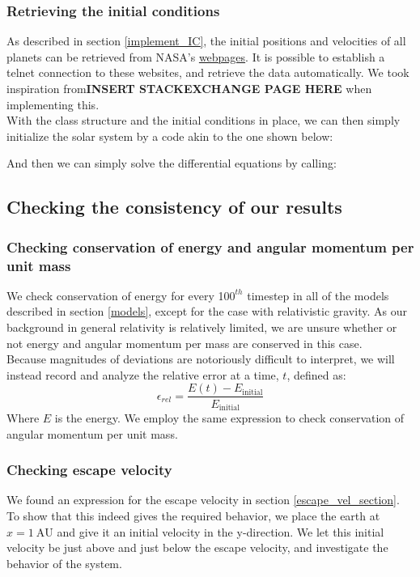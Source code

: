 \documentclass[a4paper, 10pt]{article}
\begin{document}
\subsubsection{Retrieving the initial conditions}
As described in section \ref{implement_IC}, the initial positions and velocities of all planets can be retrieved from NASA's  \href{http://ssd.jpl.nasa.gov/horizons.cgi#top}{webpages}. It is possible to establish a telnet connection to these websites, and retrieve the data automatically. We took inspiration from\textbf{INSERT STACKEXCHANGE PAGE HERE} when implementing this.\\
\linebreak
\linebreak
With the class structure and the initial conditions in place, we can then simply initialize the solar system by a code akin to the one shown below:

And then we can simply solve the differential equations by calling:


\subsection{Checking the consistency of our results}
\subsubsection{Checking conservation of energy and angular momentum per unit mass}
We check conservation of energy for every 10$0^{th}$ timestep in all of the models described in section \ref{models}, except for the case with relativistic gravity. As our background in general relativity is relatively limited, we are unsure whether or not energy and angular momentum per mass are conserved in this case.\\
\linebreak
Because magnitudes of deviations are notoriously difficult to interpret, we will instead record and analyze the relative error at a time, $t$, defined as:
\begin{equation}\label{eq:relative_error}
\epsilon_{rel}=\frac{E(t)-E_{\mathrm{initial}}}{E_{\mathrm{initial}}}
\end{equation}
Where $E$ is the energy. We employ the same expression to check conservation of angular momentum per unit mass.
\subsubsection{Checking escape velocity}
We found an expression for the escape velocity in section \ref{escape_vel_section}. To show that this indeed gives the required behavior, we place the earth at $x=1\ \mathrm{AU}$ and give it an initial velocity in the y-direction. We let this initial velocity be just above and just below the escape velocity, and investigate the behavior of the system.
\end{document}
